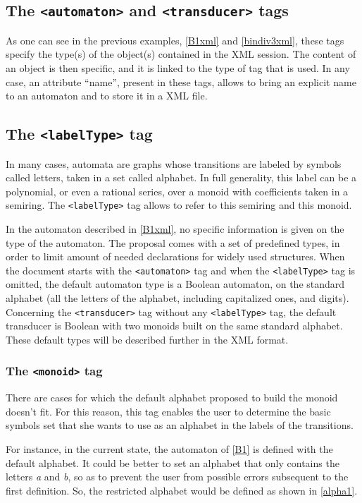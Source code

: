 \documentclass[a4paper]{article}
\newcommand{\xtag}[1]{\texttt{<#1>}}
\begin{document}
\subsection{The \xtag{automaton} and \xtag{transducer} tags}

As one can see in the previous examples, \autoref{B1xml} and
\autoref{bindiv3xml}, these tags specify the type(s) of the object(s)
contained in the XML session. The content of an object is then
specific, and it is linked to the type of tag that is used.  In any
case, an attribute ``name'', present in these tags, allows to bring an
explicit name to an automaton and to store it in a XML file.

\subsection{The \xtag{labelType} tag}

In many cases, automata are graphs whose transitions are labeled by
symbols called letters, taken in a set called alphabet. In full
generality, this label can be a polynomial, or even a rational series,
over a monoid with coefficients taken in a semiring. The \xtag{labelType}
tag allows to refer to this semiring and this monoid.

In the automaton described in \autoref{B1xml}, no specific information
is given on the type of the automaton. The proposal comes with a set
of predefined types, in order to limit amount of needed declarations
for widely used structures. When the document starts with the
\xtag{automaton} tag and when the \xtag{labelType} tag is omitted, the
default automaton type is a Boolean automaton, on the standard
alphabet (all the letters of the alphabet, including capitalized ones,
and digits).  Concerning the \xtag{transducer} tag without any
\xtag{labelType} tag, the default transducer is Boolean with two monoids
built on the same standard alphabet.  These default types will be
described further in the XML format.


\subsubsection{The \xtag{monoid} tag}

There are cases for which the default alphabet proposed to build the
monoid doesn't fit. For this reason, this tag enables the user to
determine the basic symbols set that she wants to use as an alphabet
in the labels of the transitions.

For instance, in the current state, the automaton of \autoref{B1} is
defined with the default alphabet. It could be better to set an
alphabet that only contains the letters \textit{a} and \textit{b}, so
as to prevent the user from possible errors subsequent to the first
definition. So, the restricted alphabet would be defined as shown in
\autoref{alpha1}.
\end{document}
